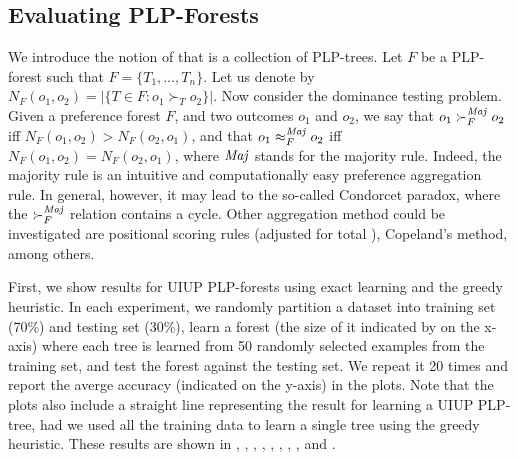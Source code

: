 \subsection{Evaluating PLP-Forests}
We introduce the notion of  that is a collection of
PLP-trees.
Let $F$ be a PLP-forest such that $F = \{T_1,\ldots,T_n\}$.
Let us denote by $N_F(o_1,o_2)=|\{T \in F:o_1 \succ_T o_2\}|$.
Now consider the dominance testing problem.
Given a preference forest $F$, and two outcomes $o_1$ and $o_2$,
we say that $o_1 \succ_F^{\mathit{Maj}} o_2$ iff $N_F(o_1,o_2)>N_F(o_2,o_1)$,
and that $o_1 \approx_F^{\mathit{Maj}} o_2$ iff $N_F(o_1,o_2)=N_F(o_2,o_1)$,
where $\mathit{Maj}$ stands for the majority rule.
Indeed, the majority rule is an intuitive and computationally easy
preference aggregation rule.
In general, however, it may lead to the so-called Condorcet paradox, where
the $\succ_F^{\mathit{Maj}}$ relation contains a cycle.
Other aggregation method could be investigated are positional
scoring rules (adjusted for total ), Copeland's
method, among others.

First, we show results for UIUP PLP-forests using exact learning
and the greedy heuristic.
In each experiment, we randomly partition a dataset into training
set (70\%) and testing set (30\%), learn a forest (the size of it
indicated by on the x-axis) where
each tree is learned from 50 randomly selected examples from the
training set, and test the forest against the testing set.
We repeat it 20 times and report the averge accuracy (indicated on
the y-axis) in the plots.
Note that the plots also include a straight line representing
the result for learning a UIUP PLP-tree, had we used all the
training data to learn a single tree using the greedy heuristic.
These results are shown in , , , ,
, , , , and .


